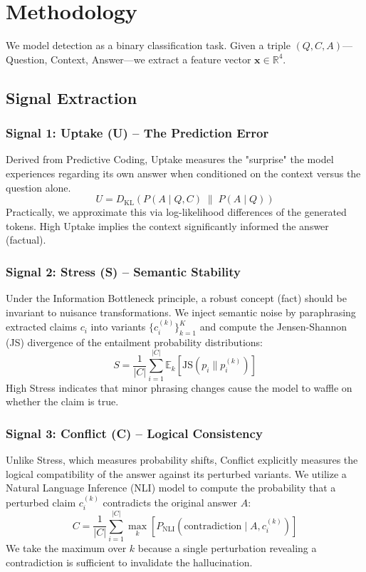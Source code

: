 \documentclass[11pt,letterpaper]{article}
\newcommand{\DKL}{D_{\text{KL}}}
\newcommand{\JS}{\text{JS}}
\newcommand{\E}{\mathbb{E}}
\begin{document}
\section{Methodology}

We model detection as a binary classification task. Given a triple $(Q, C, A)$—Question, Context, Answer—we extract a feature vector $\mathbf{x} \in \mathbb{R}^4$.

\subsection{Signal Extraction}

\subsubsection{Signal 1: Uptake (U) -- The Prediction Error}
Derived from Predictive Coding, Uptake measures the "surprise" the model experiences regarding its own answer when conditioned on the context versus the question alone.
\begin{equation}
    U = \DKL\left( P(A \mid Q, C) \;\middle\|\; P(A \mid Q) \right)
\end{equation}
Practically, we approximate this via log-likelihood differences of the generated tokens. High Uptake implies the context significantly informed the answer (factual).

\subsubsection{Signal 2: Stress (S) -- Semantic Stability}
Under the Information Bottleneck principle, a robust concept (fact) should be invariant to nuisance transformations. We inject semantic noise by paraphrasing extracted claims $c_i$ into variants $\{c_i^{(k)}\}_{k=1}^K$ and compute the Jensen-Shannon (JS) divergence of the entailment probability distributions:
\begin{equation}
    S = \frac{1}{|C|} \sum_{i=1}^{|C|} \E_k \left[ \JS\left( p_i \parallel p_i^{(k)} \right) \right]
\end{equation}
High Stress indicates that minor phrasing changes cause the model to waffle on whether the claim is true.

\subsubsection{Signal 3: Conflict (C) -- Logical Consistency}
Unlike Stress, which measures probability shifts, Conflict explicitly measures the logical compatibility of the answer against its perturbed variants. We utilize a Natural Language Inference (NLI) model to compute the probability that a perturbed claim $c_i^{(k)}$ contradicts the original answer $A$:
\begin{equation}
    C = \frac{1}{|C|} \sum_{i=1}^{|C|} \max_k \left[ P_{\text{NLI}}(\text{contradiction} \mid A, c_i^{(k)}) \right]
\end{equation}
We take the maximum over $k$ because a single perturbation revealing a contradiction is sufficient to invalidate the hallucination.
\end{document}
